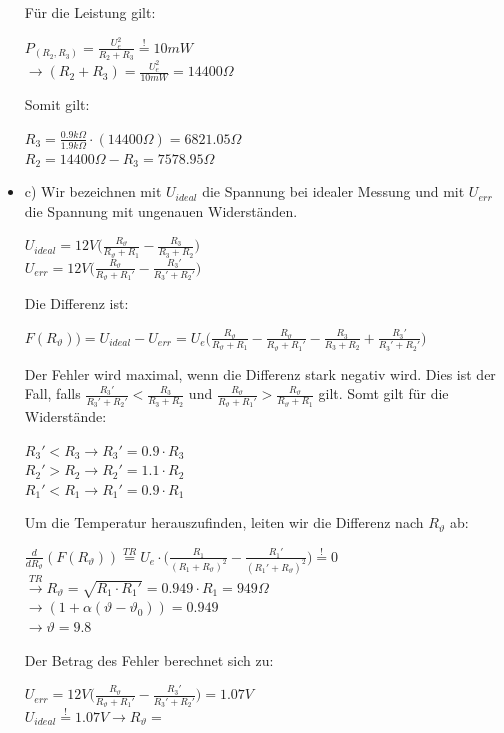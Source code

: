 \begin{itemize}
  Für die Leistung gilt:
  \begin{center}
    $P_{(R_2,R_3)} = \frac{U_e^2}{R_2 + R_3}  \stackrel{!}{=} 10mW$ \\
    $\rightarrow (R_2 + R_3) = \frac{U_e^2}{10mW} = 14400\Omega$
  \end{center}
  Somit gilt:
  \begin{center}
    $R_3 = \frac{0.9 k\Omega}{1.9 k\Omega} \cdot (14400\Omega) = 6821.05 \Omega $ \\
    $R_2 = 14400\Omega - R_3 = 7578.95 \Omega$
  \end{center}


  \item c) Wir bezeichnen mit $U_{ideal}$ die Spannung bei idealer Messung und mit $U_{err}$ die Spannung mit ungenauen Widerständen.
  \begin{center}
    $U_{ideal} = 12V \big( \frac{R_\vartheta}{R_\vartheta + R_1} - \frac{R_3}{R_3 + R_2}\big)$ \\
    $U_{err} = 12V \big( \frac{R_\vartheta}{R_\vartheta + R_1' } - \frac{R_3'}{R_3'+R_2'}\big)$
  \end{center}
  Die Differenz ist:
  \begin{center}
    $F(R_\vartheta)) = U_{ideal} - U_{err} = U_e \big (\frac{R_\vartheta}{R_\vartheta + R_1 } -\frac{R_\vartheta}{R_\vartheta + R_1'} - \frac{R_3}{R_3 + R_2} + \frac{R_3'}{R_3'+R_2'})$
  \end{center}
  Der Fehler wird maximal, wenn die Differenz stark negativ wird. Dies ist der Fall, falls $\frac{R_3'}{R_3'+R_2'} < \frac{R_3}{R_3+R_2}$ und $  \frac{R_\vartheta}{R_\vartheta + R_1'} > \frac{R_\vartheta}{R_\vartheta + R_1}$  gilt. Somt gilt für die Widerstände:

   \begin{center}
     $R_3' < R_3 \rightarrow R_3' = 0.9 \cdot R_3$ \\
      $R_2' > R_2 \rightarrow R_2' = 1.1 \cdot R_2$ \\
      $R_1' < R_1 \rightarrow R_1' = 0.9 \cdot R_1$
   \end{center}
  Um die Temperatur herauszufinden, leiten wir die Differenz nach $R_\vartheta$ ab:
  \begin{center}
    $\frac{d}{d R_\vartheta} (F(R_\vartheta)) \stackrel{TR}{=} U_e \cdot \big( \frac{R_1}{(R_1 + R_\vartheta)^2} - \frac{R_1'}{(R_1' + R_\vartheta)^2}\big)\stackrel{!}{=} 0$ \\
    $\stackrel{TR}{\rightarrow} R_\vartheta = \sqrt{R_1 \cdot R_1'} = 0.949 \cdot R_1 = 949 \Omega$ \\
    $\rightarrow (1 + \alpha (\vartheta - \vartheta_0)) = 0.949  $ \\
    $\rightarrow \vartheta = 9.8$\textdegree
  \end{center}
  Der Betrag des Fehler berechnet sich zu:
  \begin{center}
      $ U_{err} = 12V \big( \frac{R_\vartheta}{R_\vartheta + R_1'} - \frac{R_3'}{R_3' + R_2'} \big) = 1.07V$ \\
      $ U_{ideal} \stackrel{!}{=} 1.07V \rightarrow R_\vartheta = $
  \end{center}
\end{itemize}

